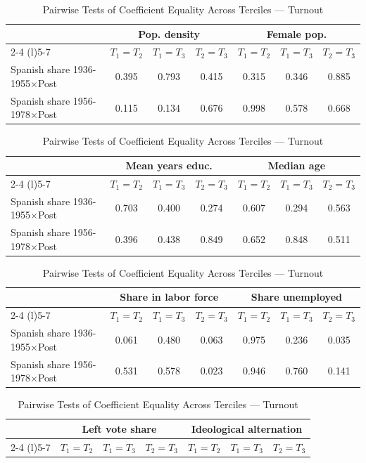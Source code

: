 \begin{table}[!h]
\centering
\renewcommand{\arraystretch}{1.15}
\setlength{\tabcolsep}{4pt}
\caption{Pairwise Tests of Coefficient Equality Across Terciles — Turnout}
\begin{tabular*}{\textwidth}{l@{\extracolsep{\fill}}cccccc}
\hline
 & \multicolumn{3}{c}{Pop. density} & \multicolumn{3}{c}{Female pop.} \\
\cmidrule(l){2-4} \cmidrule(l){5-7}
 & $T_1 = T_2$ & $T_1 = T_3$ & $T_2 = T_3$ & $T_1 = T_2$ & $T_1 = T_3$ & $T_2 = T_3$ \\
\hline
Spanish share 1936-1955$\times$Post & 0.395 & 0.793 & 0.415 & 0.315 & 0.346 & 0.885 \\
Spanish share 1956-1978$\times$Post & 0.115 & 0.134 & 0.676 & 0.998 & 0.578 & 0.668 \\
\hline
\end{tabular*}
\begin{tabular*}{\textwidth}{l@{\extracolsep{\fill}}cccccc}
 & \multicolumn{3}{c}{Mean years educ.} & \multicolumn{3}{c}{Median age} \\
\cmidrule(l){2-4} \cmidrule(l){5-7}
 & $T_1 = T_2$ & $T_1 = T_3$ & $T_2 = T_3$ & $T_1 = T_2$ & $T_1 = T_3$ & $T_2 = T_3$ \\
\hline
Spanish share 1936-1955$\times$Post & 0.703 & 0.400 & 0.274 & 0.607 & 0.294 & 0.563 \\
Spanish share 1956-1978$\times$Post & 0.396 & 0.438 & 0.849 & 0.652 & 0.848 & 0.511 \\
\hline
\end{tabular*}
\begin{tabular*}{\textwidth}{l@{\extracolsep{\fill}}cccccc}
 & \multicolumn{3}{c}{Share in labor force} & \multicolumn{3}{c}{Share unemployed} \\
\cmidrule(l){2-4} \cmidrule(l){5-7}
 & $T_1 = T_2$ & $T_1 = T_3$ & $T_2 = T_3$ & $T_1 = T_2$ & $T_1 = T_3$ & $T_2 = T_3$ \\
\hline
Spanish share 1936-1955$\times$Post & 0.061 & 0.480 & 0.063 & 0.975 & 0.236 & 0.035 \\
Spanish share 1956-1978$\times$Post & 0.531 & 0.578 & 0.023 & 0.946 & 0.760 & 0.141 \\
\hline
\end{tabular*}
\begin{tabular*}{\textwidth}{l@{\extracolsep{\fill}}cccccc}
 & \multicolumn{3}{c}{Left vote share} & \multicolumn{3}{c}{Ideological alternation} \\
\cmidrule(l){2-4} \cmidrule(l){5-7}
 & $T_1 = T_2$ & $T_1 = T_3$ & $T_2 = T_3$ & $T_1 = T_2$ & $T_1 = T_3$ & $T_2 = T_3$ \\

\end{tabular*}
\end{table}
